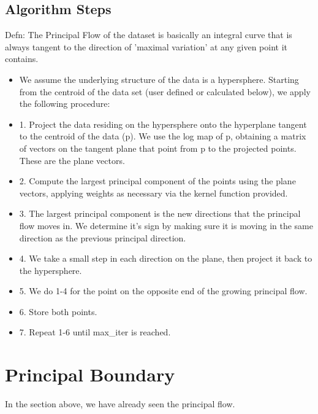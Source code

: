 \documentclass[12pt]{report}
\begin{document}
\section{Algorithm Steps}
Defn: The Principal Flow of the dataset is basically an integral curve 
that is always tangent to the direction of 'maximal variation' at any given point 
it contains.
\begin{itemize}
    \item We assume the underlying structure of the data is a hypersphere.
    Starting from the centroid of the data set (user defined or calculated below), we apply the following procedure: 
    \item 1. Project the data residing on the hypersphere onto the hyperplane
    tangent to the centroid of the data (p). We use the log map of p, 
    obtaining a matrix of vectors on the tangent plane that point from p
    to the projected points. These are the plane vectors.

    \item 2. Compute the largest principal component of the points using the plane vectors, applying weights as necessary via the kernel function provided.

    \item 3. The largest principal component is the new directions that the principal flow moves in. We determine it's sign by making sure it is moving in the same direction as the previous principal direction.

    \item 4. We take a small step in each direction on the plane,
    then project it back to the hypersphere.

    \item 5. We do 1-4 for the point on the opposite end of the growing principal flow.

    \item 6. Store both points. 
    
    \item 7. Repeat 1-6 until max\_iter is reached.
\end{itemize}

\chapter*{Principal Boundary}

In the section above, we have already seen the principal flow.
\end{document}
